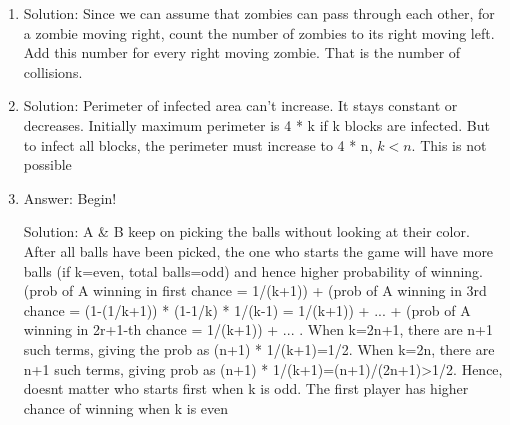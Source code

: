 \begin{enumerate}

\item
Solution: Since we can assume that zombies can pass through each other, for a zombie moving right, count the number of zombies to its right moving left. Add this number for every right moving zombie. That is the number of collisions.




\item
Solution: Perimeter of infected area can't increase. It stays constant or decreases. Initially maximum perimeter is 4 * k if k blocks are infected. But to infect all blocks, the perimeter must increase to 4 * n, $k<n$. This is not possible




\item
Answer: Begin!
 
Solution: A \& B keep on picking the balls without looking at their color. After all balls have been picked, the one who starts the game will have more balls (if k=even, total balls=odd) and hence higher probability of winning.
(prob of A winning in first chance = 1/(k+1)) +
(prob of A winning in 3rd chance = (1-(1/k+1)) * (1-1/k) * 1/(k-1) = 1/(k+1)) + ... +
(prob of A winning in 2r+1-th chance = 1/(k+1)) + ... .
When k=2n+1, there are n+1 such terms, giving the prob as (n+1) * 1/(k+1)=1/2.
When k=2n, there are n+1 such terms, giving prob as (n+1) * 1/(k+1)=(n+1)/(2n+1)>1/2.
Hence, doesnt matter who starts first when k is odd.
The first player has higher chance of winning when k is even





\end{enumerate}
